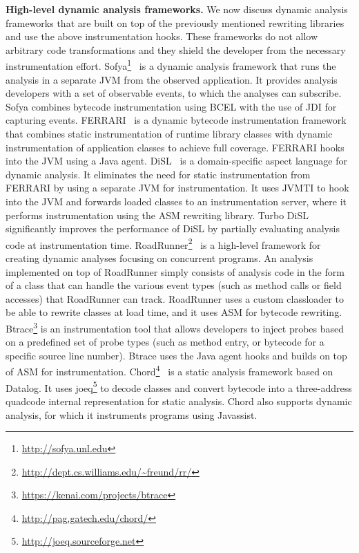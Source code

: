 \textbf{High-level dynamic analysis frameworks.}
We now discuss dynamic analysis frameworks that are built on top of the previously mentioned rewriting libraries
and use the above instrumentation hooks.
These frameworks do not allow arbitrary code transformations 
and they shield the developer from the necessary instrumentation effort.
%
Sofya\footnote{\url{http://sofya.unl.edu}}~\cite{kinneerSofyaSupportingRapid2007} 
is a dynamic analysis framework that runs the analysis in a separate JVM from the observed application.
It provides analysis developers with a set of observable events, to which the analyses can subscribe.
Sofya combines bytecode instrumentation using BCEL with the use of JDI for capturing events.
FERRARI~\cite{binderReengineeringStandardJava2007} is a dynamic bytecode instrumentation framework
that combines static instrumentation of runtime library classes with
dynamic instrumentation of application classes to achieve full coverage.
FERRARI hooks into the JVM using a Java agent.
DiSL~\cite{marekDiSLDomainspecificLanguage2012,marekDiSLExtensibleLanguage2012}
is a domain-specific aspect language for dynamic analysis.
It eliminates the need for static instrumentation from FERRARI
by using a separate JVM for instrumentation.
It uses JVMTI to hook into the JVM and 
forwards loaded classes to an instrumentation server,
where it performs instrumentation using the ASM rewriting library.
Turbo DiSL~\cite{zhengTurboDiSLPartial2012} significantly improves the performance of DiSL 
by partially evaluating analysis code at instrumentation time.
RoadRunner\footnote{\url{http://dept.cs.williams.edu/~freund/rr/}}~\cite{flanaganRoadRunnerDynamicAnalysis2010}
is a high-level framework for creating dynamic analyses focusing on concurrent programs.
An analysis implemented on top of RoadRunner simply consists of analysis code
in the form of a class that can handle the various event types 
(such as method calls or field accesses) that RoadRunner can track.
RoadRunner uses a custom classloader to be able to rewrite classes at load time,
and it uses ASM for bytecode rewriting.
Btrace\footnote{\url{https://kenai.com/projects/btrace}} is an instrumentation tool
that allows developers to inject probes based on a predefined set of probe types
(such as method entry, or bytecode for a specific source line number).
Btrace uses the Java agent hooks and builds on top of ASM for instrumentation.
Chord\footnote{\url{http://pag.gatech.edu/chord/}}~\cite{naik11} is a static analysis framework based on Datalog.
It uses joeq\footnote{\url{http://joeq.sourceforge.net}} to decode classes and 
convert bytecode into a three-address quadcode internal representation for static analysis.
Chord also supports dynamic analysis, 
for which it instruments programs using Javassist.

